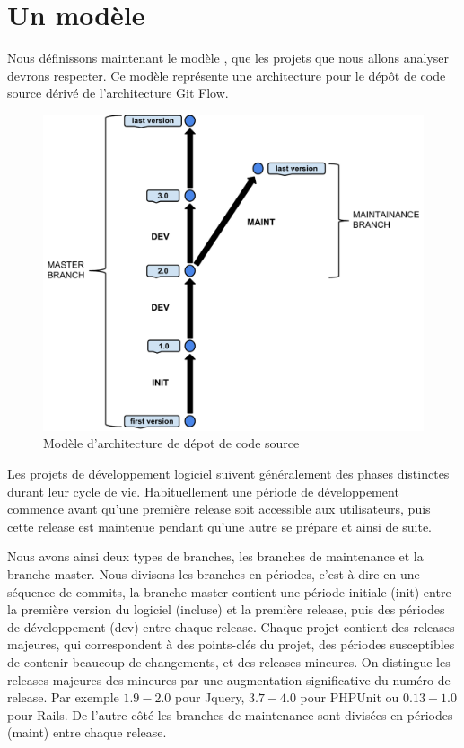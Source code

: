 \section{Un modèle}
\label{sec:model}

Nous définissons maintenant le modèle , que les projets que nous allons analyser devrons respecter. Ce modèle représente une architecture pour le dépôt de code source dérivé de l'architecture Git Flow.\\

\begin{figure}[h]
  \centering
  \includegraphics[scale=0.5]{data/figures/periods.pdf}
	\caption{Modèle d'architecture de dépot de code source}
	\label{fig:model}
\end{figure}

Les projets de développement logiciel suivent généralement des phases distinctes durant leur cycle de vie. Habituellement une période de développement commence avant qu'une première release soit accessible aux utilisateurs, puis cette release est maintenue pendant qu'une autre se prépare et ainsi de suite.

Nous avons ainsi deux types de branches, les branches de maintenance et la branche master. Nous divisons les branches en périodes, c'est-à-dire en une séquence de commits, la branche master contient une période initiale (init) entre la première version du logiciel (incluse) et la première release, puis des périodes de développement (dev) entre chaque release. Chaque projet contient des releases majeures, qui correspondent à des points-clés du projet, des périodes susceptibles de contenir beaucoup de changements, et des releases mineures. On distingue les releases majeures des mineures par une augmentation significative du numéro de release. Par exemple $1.9-2.0$ pour Jquery, $3.7-4.0$ pour PHPUnit ou $0.13-1.0$ pour Rails. De l'autre côté les branches de maintenance sont divisées en périodes (maint) entre chaque release.\\
 

